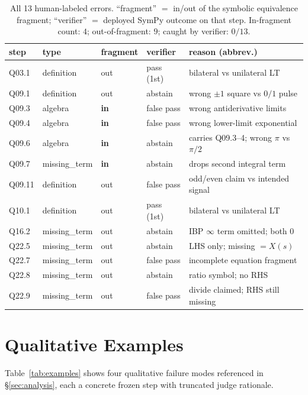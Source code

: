 \begin{table}[tp]
\centering
\footnotesize
\setlength{\tabcolsep}{3pt}
\begin{tabular}{lllll}
\toprule
step & type & fragment & verifier & reason (abbrev.) \\
\midrule
Q03.1 & definition & out & pass (1st) & bilateral vs unilateral LT \\
Q09.1 & definition & out & abstain & wrong $\pm 1$ square vs $0/1$ pulse \\
Q09.3 & algebra & \textbf{in} & false pass & wrong antiderivative limits \\
Q09.4 & algebra & \textbf{in} & false pass & wrong lower-limit exponential \\
Q09.6 & algebra & \textbf{in} & abstain & carries Q09.3--4; wrong $\pi$ vs $\pi/2$ \\
Q09.7 & missing\_term & \textbf{in} & abstain & drops second integral term \\
Q09.11 & definition & out & false pass & odd/even claim vs intended signal \\
Q10.1 & definition & out & pass (1st) & bilateral vs unilateral LT \\
Q16.2 & missing\_term & out & abstain & IBP $\infty$ term omitted; both $0$ \\
Q22.5 & missing\_term & out & abstain & LHS only; missing ${=}X(s)$ \\
Q22.7 & missing\_term & out & false pass & incomplete equation fragment \\
Q22.8 & missing\_term & out & abstain & ratio symbol; no RHS \\
Q22.9 & missing\_term & out & false pass & divide claimed; RHS still missing \\
\bottomrule
\end{tabular}
\caption{All 13 human-labeled errors. ``fragment'' $=$ in/out of the symbolic
equivalence fragment; ``verifier'' $=$ deployed SymPy outcome on that step.
In-fragment count: $4$; out-of-fragment: $9$; caught by verifier: $0/13$.}
\label{tab:human-errors}
\end{table}

\section{Qualitative Examples}
\label{app:examples}

Table~\ref{tab:examples} shows four qualitative failure modes referenced in
\S\ref{sec:analysis}, each a concrete frozen step with truncated judge
rationale.

